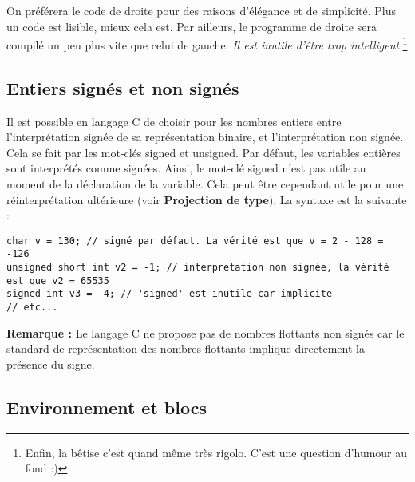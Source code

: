 \documentclass[../../../main.tex]{subfiles}
\begin{document}
On préférera le code de droite pour des raisons d'élégance et de simplicité. Plus un code est lisible, mieux cela est. Par ailleurs, le programme de droite sera compilé un peu plus vite que celui de gauche. \textit{Il est inutile d'être trop intelligent.}\footnote{Enfin, la bêtise c'est quand même très rigolo. C'est une question d'humour au fond :)}
\subsection{Entiers signés et non signés}
\label{sub:entiers_sign_s_et_non_sign_s}
Il est possible en langage C de choisir pour les nombres entiers entre l'interprétation signée de sa représentation binaire, et l'interprétation non signée. Cela se fait par les mot-clés \textsf{signed} et \textsf{unsigned}. Par défaut, les variables entières sont interprétés comme signées. Ainsi, le mot-clé \textsf{signed} n'est pas utile au moment de la déclaration de la variable. Cela peut être cependant utile pour une réinterprétation ultérieure (voir \textbf{Projection de type}). La syntaxe est la suivante :
\begin{verbatim}
char v = 130; // signé par défaut. La vérité est que v = 2 - 128 = -126
unsigned short int v2 = -1; // interpretation non signée, la vérité est que v2 = 65535
signed int v3 = -4; // 'signed' est inutile car implicite
// etc...
\end{verbatim}
\textbf{Remarque :} Le langage C ne propose pas de nombres flottants non signés car le standard de représentation des nombres flottants implique directement la présence du signe.

\subsection{Environnement et blocs}
\label{sub:environnement_et_blocs}

\end{document}
